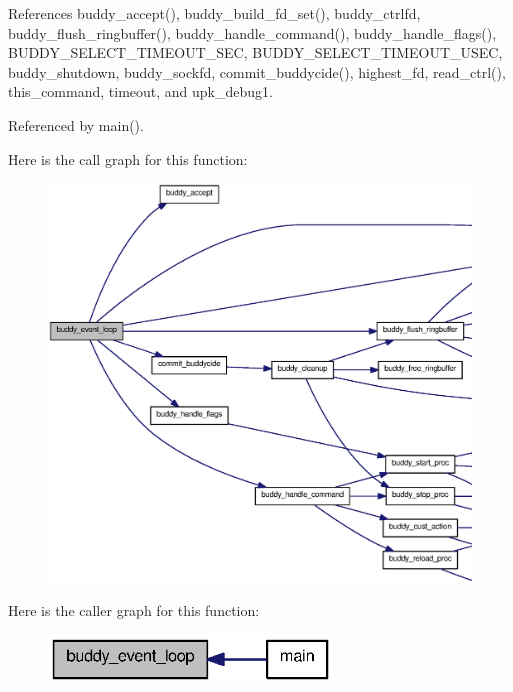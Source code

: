 References buddy\_\-accept(), buddy\_\-build\_\-fd\_\-set(), buddy\_\-ctrlfd, buddy\_\-flush\_\-ringbuffer(), buddy\_\-handle\_\-command(), buddy\_\-handle\_\-flags(), BUDDY\_\-SELECT\_\-TIMEOUT\_\-SEC, BUDDY\_\-SELECT\_\-TIMEOUT\_\-USEC, buddy\_\-shutdown, buddy\_\-sockfd, commit\_\-buddycide(), highest\_\-fd, read\_\-ctrl(), this\_\-command, timeout, and upk\_\-debug1.



Referenced by main().



Here is the call graph for this function:\nopagebreak
\begin{figure}[H]
\begin{center}
\leavevmode
\includegraphics[width=400pt]{buddy_8h_ae6ccfa70197441b53a9e94023ee4671c_cgraph}
\end{center}
\end{figure}




Here is the caller graph for this function:\nopagebreak
\begin{figure}[H]
\begin{center}
\leavevmode
\includegraphics[width=214pt]{buddy_8h_ae6ccfa70197441b53a9e94023ee4671c_icgraph}
\end{center}
\end{figure}


